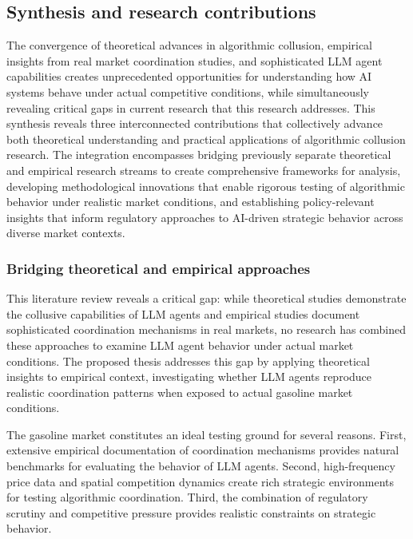 \subsection{Synthesis and research contributions}

The convergence of theoretical advances in algorithmic collusion, empirical insights from real market coordination studies, and sophisticated LLM agent capabilities creates unprecedented opportunities for understanding how AI systems behave under actual competitive conditions, while simultaneously revealing critical gaps in current research that this research addresses. This synthesis reveals three interconnected contributions that collectively advance both theoretical understanding and practical applications of algorithmic collusion research. The integration encompasses bridging previously separate theoretical and empirical research streams to create comprehensive frameworks for analysis, developing methodological innovations that enable rigorous testing of algorithmic behavior under realistic market conditions, and establishing policy-relevant insights that inform regulatory approaches to AI-driven strategic behavior across diverse market contexts.

\subsubsection*{Bridging theoretical and empirical approaches}

This literature review reveals a critical gap: while theoretical studies demonstrate the collusive capabilities of LLM agents and empirical studies document sophisticated coordination mechanisms in real markets, no research has combined these approaches to examine LLM agent behavior under actual market conditions. The proposed thesis addresses this gap by applying \textcite{fish_algorithmic_2025} theoretical insights to \textcite{byrne_learning_2019} empirical context, investigating whether LLM agents reproduce realistic coordination patterns when exposed to actual gasoline market conditions.

The gasoline market constitutes an ideal testing ground for several reasons. First, extensive empirical documentation of coordination mechanisms provides natural benchmarks for evaluating the behavior of LLM agents. Second, high-frequency price data and spatial competition dynamics create rich strategic environments for testing algorithmic coordination. Third, the combination of regulatory scrutiny and competitive pressure provides realistic constraints on strategic behavior.

